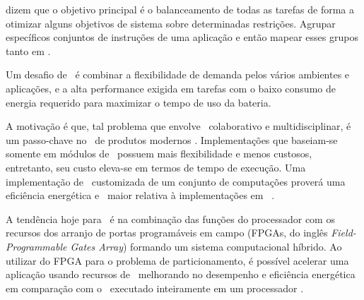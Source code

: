 	\citet{Hidalgo1997} dizem que o objetivo principal é o balanceamento de todas as tarefas de forma a otimizar alguns objetivos de sistema sobre determinadas restrições.
	Agrupar específicos conjuntos de instruções de uma aplicação e então mapear esses grupos tanto em \hs.

   
   Um desafio de \design\ é combinar a flexibilidade de demanda pelos vários ambientes e aplicações, e a alta performance exigida em tarefas com o baixo consumo de energia requerido para maximizar o tempo de uso da bateria.


   A motivação é que, tal problema que envolve \design\ colaborativo e multidisciplinar, é um passo-chave no \design\ de produtos modernos \citep{Trappey2016}. 
   Implementações que baseiam-se somente em módulos de \software\ possuem mais flexibilidade e menos custosos, entretanto, seu custo eleva-se em termos de tempo de execução. Uma implementação de \hardware\ customizada de um conjunto de computações proverá uma eficiência energética e \speedup\ maior relativa à implementações em \software\ \citep{Zhang2008, Hassine2017, Wolf1994, Canis2011, Stone2010}.

   A tendência hoje para \design\ é na combinação das funções do processador com os recursos dos arranjo de portas programáveis em campo (FPGAs, do inglês \textit{Field-Programmable Gates Array}) formando um sistema computacional híbrido. %
	Ao utilizar do FPGA para o problema de particionamento, é possível acelerar uma aplicação usando recursos de \hardware\ melhorando no desempenho e eficiência energética em comparação com o \software\ executado inteiramente em um processador \citep{Cong2009, Lo2009, Zhang2008a}. 


